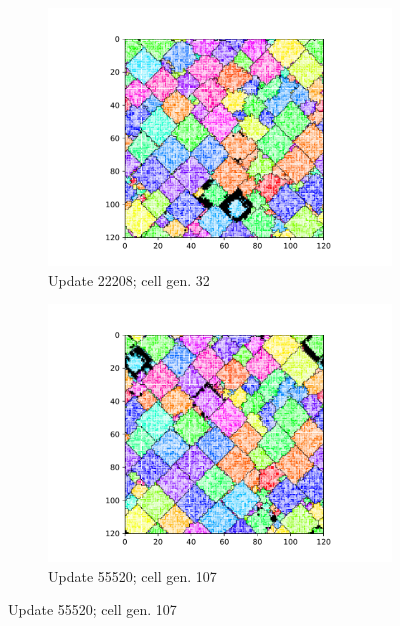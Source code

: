 \begin{figure}
\begin{center}
\begin{subfigure}[b]{0.33\columnwidth}
  \includegraphics[width=\columnwidth,trim={2.5cm 0.5cm 2.5cm 1cm},clip]{img/ChannelMap_1030_update22208}
  \vspace{-5ex}
  \caption{Update 22208; cell gen. 32}
  \label{fig:ChannelMap_1030_update22208}
\end{subfigure}%
\begin{subfigure}[b]{0.33\columnwidth}
  \includegraphics[width=\columnwidth,trim={2.5cm 0.5cm 2.5cm 1cm},clip]{img/ChannelMap_1030_update55520}
  \vspace{-5ex}
  \caption{Update 55520; cell gen. 107}
  \label{fig:ChannelMap_1030_update1000000}
\end{subfigure}%

\end{center}
\end{figure}
